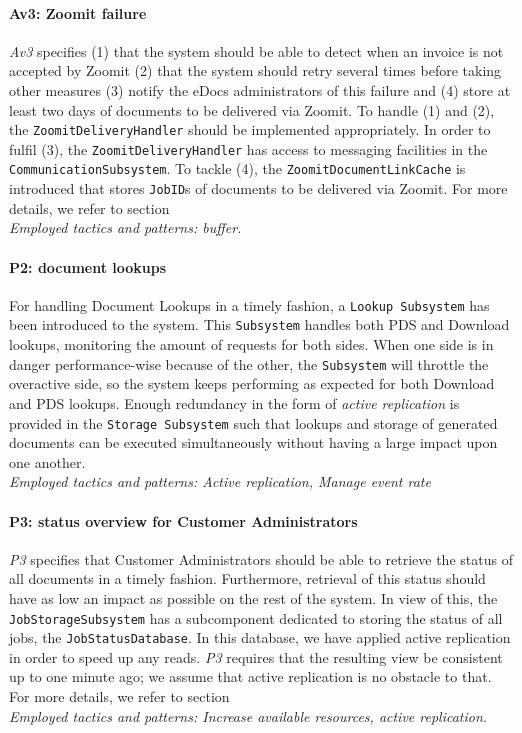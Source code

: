 \paragraph{Av3: Zoomit failure} \emph{Av3} specifies (1) that the system should be able to detect when an invoice is not accepted by Zoomit (2) that the system should retry several times before taking other measures (3) notify the eDocs administrators of this failure and (4) store at least two days of documents to be delivered via Zoomit. To handle (1) and (2), the \texttt{ZoomitDeliveryHandler} should be implemented appropriately. In order to fulfil (3), the \texttt{ZoomitDeliveryHandler} has access to messaging facilities in the \texttt{CommunicationSubsystem}. To tackle (4), the \texttt{ZoomitDocumentLinkCache} is introduced that stores \texttt{JobID}s of documents to be delivered via Zoomit. For more details, we refer to section \\
\emph{Employed tactics and patterns: buffer.}
    
\paragraph{P2: document lookups}
For handling Document Lookups in a timely fashion, a \texttt{Lookup Subsystem} has been introduced to the system. This \texttt{Subsystem} handles both PDS and Download lookups, monitoring the amount of requests for both sides. When one side is in danger performance-wise because of the other, the \texttt{Subsystem} will throttle the overactive side, so the system keeps performing as expected for both Download and PDS lookups. Enough redundancy in the form of \emph{active replication} is provided in the \texttt{Storage Subsystem} such that lookups and storage of generated documents can be executed simultaneously without having a large impact upon one another.\\
\emph{Employed tactics and patterns: Active replication, Manage event rate}
    
\paragraph{P3: status overview for Customer Administrators} \emph{P3} specifies that Customer Administrators should be able to retrieve the status of all documents in a timely fashion. Furthermore, retrieval of this status should have as low an impact as possible on the rest of the system. In view of this, the \texttt{JobStorageSubsystem} has a subcomponent dedicated to storing the status of all jobs, the \texttt{JobStatusDatabase}. In this database, we have applied active replication in order to speed up any reads. \emph{P3} requires that the resulting view be consistent up to one minute ago; we assume that active replication is no obstacle to that. For more details, we refer to section \\
\emph{Employed tactics and patterns: Increase available resources, active replication.}
    
